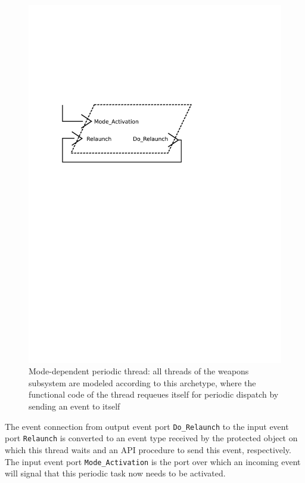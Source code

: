 \begin{figure}
\centering
\includegraphics[scale=0.5]{figs/mode_periodic}
\caption{Mode-dependent periodic thread: {\normalsize all threads of
    the weapons subsystem are modeled according to this archetype,
    where the functional code of the thread requeues itself for
    periodic dispatch by sending an event to itself}}
\label{fig:mode_periodic}
\end{figure}

The event connection from output event port \texttt{Do\_Relaunch} to
the input event port \texttt{Relaunch} is converted to an event type
received by the protected object on which this thread waits and an API
procedure to send this event, respectively. The input event port
\texttt{Mode\_Activation} is the port over which an incoming event
will signal that this periodic task now needs to be activated.

